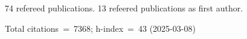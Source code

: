 74 refereed publications. 13 refeered publications as first author.

Total citations~=~7368; h-index~=~43 (2025-03-08)